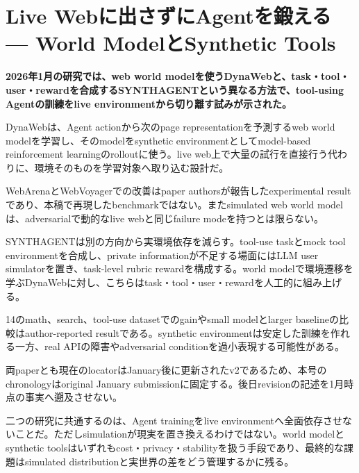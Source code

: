 \section{Live Webに出さずにAgentを鍛える — World ModelとSynthetic Tools}
\noindent\textbf{2026年1月の研究では、web world modelを使うDynaWebと、task・tool・user・rewardを合成するSYNTHAGENTという異なる方法で、tool-using Agentの訓練をlive environmentから切り離す試みが示された。}\autocite{src-01d8ab4a2c6f,src-85bc3e4f7b39}

DynaWebは、Agent actionから次のpage representationを予測するweb world modelを学習し、そのmodelをsynthetic environmentとしてmodel-based reinforcement learningのrolloutに使う。live web上で大量の試行を直接行う代わりに、環境そのものを学習対象へ取り込む設計だ。\autocite{src-85bc3e4f7b39}


\begin{claimboundary}
WebArenaとWebVoyagerでの改善はpaper authorsが報告したexperimental resultであり、本稿で再現したbenchmarkではない。またsimulated web world modelは、adversarialで動的なlive webと同じfailure modeを持つとは限らない。\autocite{src-85bc3e4f7b39}
\end{claimboundary}

SYNTHAGENTは別の方向から実環境依存を減らす。tool-use taskとmock tool environmentを合成し、private informationが不足する場面にはLLM user simulatorを置き、task-level rubric rewardを構成する。world modelで環境遷移を学ぶDynaWebに対し、こちらはtask・tool・user・rewardを人工的に組み上げる。\autocite{src-01d8ab4a2c6f}


\begin{claimboundary}
14のmath、search、tool-use datasetでのgainやsmall modelとlarger baselineの比較はauthor-reported resultである。synthetic environmentは安定した訓練を作れる一方、real APIの障害やadversarial conditionを過小表現する可能性がある。\autocite{src-01d8ab4a2c6f}
\end{claimboundary}

\begin{claimboundary}
両paperとも現在のlocatorはJanuary後に更新されたv2であるため、本号のchronologyはoriginal January submissionに固定する。後日revisionの記述を1月時点の事実へ遡及させない。\autocite{src-01d8ab4a2c6f,src-85bc3e4f7b39}
\end{claimboundary}

二つの研究に共通するのは、Agent trainingをlive environmentへ全面依存させないことだ。ただしsimulationが現実を置き換えるわけではない。world modelとsynthetic toolsはいずれもcost・privacy・stabilityを扱う手段であり、最終的な課題はsimulated distributionと実世界の差をどう管理するかに残る。\autocite{src-01d8ab4a2c6f,src-85bc3e4f7b39}

